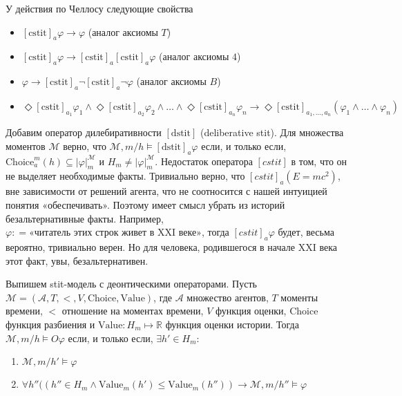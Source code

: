\documentclass[openany]{book}
\theoremstyle{plain}
\theoremstyle{definition}
\begin{document}
У действия по Челлосу следующие свойства
\begin{itemize}
\item \([\mathrm{cstit}]_a \varphi \to \varphi\) (аналог аксиомы \(T\))
\item \([\mathrm{cstit}]_a \varphi \to [\mathrm{cstit}]_a [\mathrm{cstit}]_a \varphi\) (аналог аксиомы \(4\))
\item \(\varphi \to  [\mathrm{cstit}]_a \neg [\mathrm{cstit}]_a \neg \varphi\) (аналог аксиомы \(B\))
\item \(\Diamond [\mathrm{cstit}]_{a_1} \varphi_1 \land \Diamond[\mathrm{cstit}]_{a_2} \varphi_2 \land \dots \land \Diamond[\mathrm{cstit}]_{a_n} \varphi_n \to \Diamond [\mathrm{cstit}]_{a_1, \ldots, a_n} (\varphi_1 \land \dots \land \varphi_n) \)
\end{itemize}

Добавим оператор дилебиративности \([\mathrm{dstit}]\) (deliberative stit). Для множества моментов \(\mathcal{M}\) верно, что \(\mathcal{M}, m/h \models [\mathrm{dstit}]_a \varphi\) если, и только если,  \(\mathrm{Choice}_a^m (h) \subseteq |\varphi|_m^{\mathcal{M}}\) и \(H_m \not=|\varphi|_m^{\mathcal{M}} \). Недостаток оператора \([cstit]\) в том, что он не выделяет необходимые факты. Тривиально верно, что \([cstit]_a (E = m c^2)\), вне зависимости от решений агента, что не соотносится с нашей интуицией понятия «обеспечивать». Поэтому имеет смысл убрать из историй безальтернативные факты. Например, \(\varphi : = \text{«читатель этих строк живет в XXI веке»}\), тогда \([cstit]_a \varphi\) будет, весьма вероятно, тривиально верен. Но для человека, родившегося в начале XXI века этот факт, увы, безальтернативен. 

Выпишем stit-модель с деонтическими операторами. Пусть \(\mathcal{M} = (\mathcal{A}, T, <, V, \mathrm{Choice}, \mathrm{Value})\), где \(\mathcal{A}\) множество агентов, \(T\) моменты времени, \(<\) отношение на моментах времени, \(V\) функция оценки, \(\mathrm{Choice}\) функция разбиения и \(\mathrm{Value} : H_m \mapsto \mathbb{R} \) функция оценки истории. Тогда \(\mathcal{M}, m/h \models O \varphi\) если, и только если, \(\exists h' \in H_m\):
\begin{enumerate}
\item\(\mathcal{M}, m/h' \models \varphi\)
\item\(\forall h''((h'' \in H_m \land \mathrm{Value}_m (h') \leq \mathrm{Value}_m (h'')) \to \mathcal{M}, m/h'' \models \varphi\)
\end{enumerate}
\end{document}

